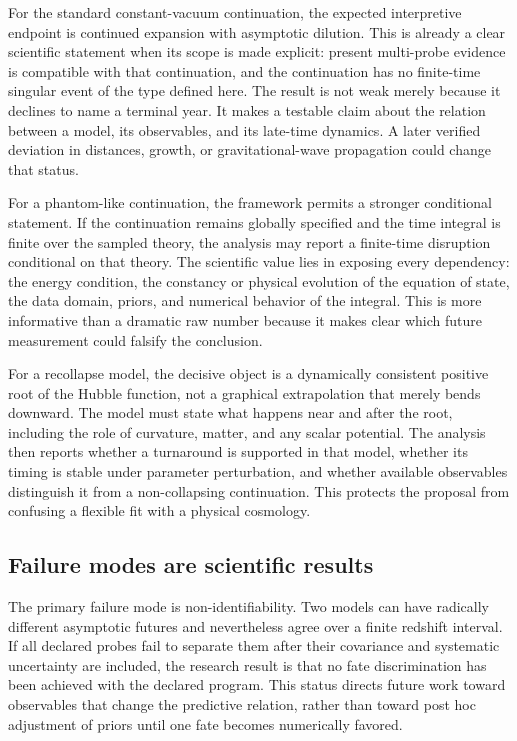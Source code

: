 \documentclass[conference]{IEEEtran}
\begin{document}
For the standard constant-vacuum continuation, the expected interpretive endpoint is continued expansion with asymptotic dilution. This is already a clear scientific statement when its scope is made explicit: present multi-probe evidence is compatible with that continuation, and the continuation has no finite-time singular event of the type defined here. The result is not weak merely because it declines to name a terminal year. It makes a testable claim about the relation between a model, its observables, and its late-time dynamics. A later verified deviation in distances, growth, or gravitational-wave propagation could change that status.

For a phantom-like continuation, the framework permits a stronger conditional statement. If the continuation remains globally specified and the time integral is finite over the sampled theory, the analysis may report a finite-time disruption conditional on that theory. The scientific value lies in exposing every dependency: the energy condition, the constancy or physical evolution of the equation of state, the data domain, priors, and numerical behavior of the integral. This is more informative than a dramatic raw number because it makes clear which future measurement could falsify the conclusion.

For a recollapse model, the decisive object is a dynamically consistent positive root of the Hubble function, not a graphical extrapolation that merely bends downward. The model must state what happens near and after the root, including the role of curvature, matter, and any scalar potential. The analysis then reports whether a turnaround is supported in that model, whether its timing is stable under parameter perturbation, and whether available observables distinguish it from a non-collapsing continuation. This protects the proposal from confusing a flexible fit with a physical cosmology.

\subsection{Failure modes are scientific results}

The primary failure mode is non-identifiability. Two models can have radically different asymptotic futures and nevertheless agree over a finite redshift interval. If all declared probes fail to separate them after their covariance and systematic uncertainty are included, the research result is that no fate discrimination has been achieved with the declared program. This status directs future work toward observables that change the predictive relation, rather than toward post hoc adjustment of priors until one fate becomes numerically favored.
\end{document}
